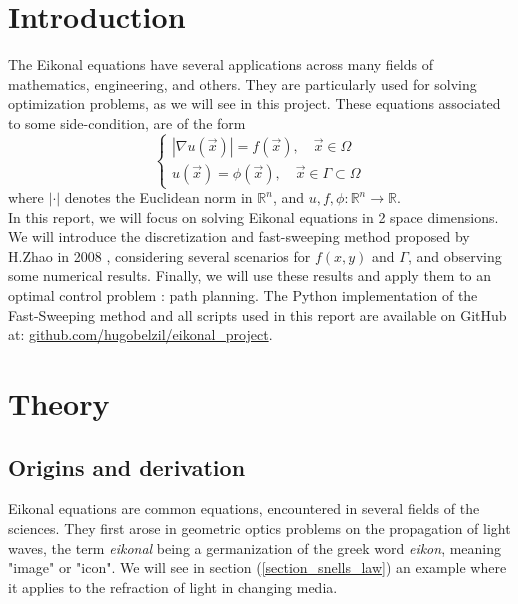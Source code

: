 \documentclass[11pt]{article}
\theoremstyle{definition}
\theoremstyle{remark}
\newcommand{\R}{\mathbb{R}}
\begin{document}
\section{Introduction}
\label{sec:intro}
The Eikonal equations have several applications across many fields of mathematics, engineering, and others. They are particularly used for solving optimization problems, as we will see in this project. These equations associated to some side-condition, are of the form \\
\begin{equation}
\label{original-eikonal}
    \begin{cases}
        |\nabla u(\vec{x})|=f(\vec{x}) , \quad\vec{x} \in\Omega\\
        u(\vec{x})=\phi(\vec{x}),\quad \vec{x} \in \Gamma \subset \Omega
    \end{cases}
\end{equation}
where $|\cdot|$ denotes the Euclidean norm in $\R^n$, and $u,f,\phi:\R^n\xrightarrow{}\R$. \\

\noindent In this report, we will focus on solving Eikonal equations in 2 space dimensions. We will introduce the discretization and fast-sweeping method proposed by H.Zhao in 2008 \cite{zhao2005}, considering several scenarios for $f(x,y)$ and $\Gamma$, and observing some numerical results. Finally, we will use these results and apply them to an optimal control problem : path planning. The Python implementation of the Fast-Sweeping method and all scripts used in this report are available on GitHub at: 
\href{https://github.com/hugobelzil/eikonal_project}{github.com/hugobelzil/eikonal\_project}.


\section{Theory}
\subsection{Origins and derivation}
Eikonal equations are common equations, encountered in several fields of the sciences. They first arose in geometric optics problems on the propagation of light waves, the term \textit{eikonal} being a germanization of the greek word \textit{eikon}, meaning "image" or "icon"\cite{wiki-eikonal}. We will see in section (\ref{section_snells_law}) an example where it applies to the refraction of light in changing media. \\
\end{document}
